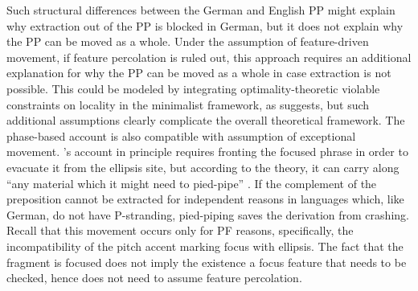 Such structural differences between the German and English PP might explain why extraction out of the PP is blocked in German, but it does not explain why the PP can be moved as a whole. Under the assumption of feature-driven movement, if feature percolation is ruled out, this approach requires an additional explanation for why the PP can be moved as a whole in case extraction is not possible. This could be modeled by integrating optimality-theoretic violable constraints on locality in the minimalist framework, as \citet{heck2008} suggests, but such additional assumptions clearly complicate the overall theoretical framework. The phase-based account is also compatible with  assumption of exceptional movement. \citeauthor{weir2014}'s account in principle requires fronting the focused phrase in order to evacuate it from the ellipsis site, but according to the theory, it can carry along ``any material which it might need to pied-pipe'' \citep[186]{weir2014}. If the complement of the preposition cannot be extracted for independent reasons in languages which, like German, do not have P-stranding, pied-piping saves the derivation from crashing. Recall that this movement occurs only for PF reasons, specifically, the incompatibility of the pitch accent marking focus with ellipsis. The fact that the fragment is focused does not imply the existence a focus feature that needs to be checked, hence \citeauthor{weir2014} does not need to assume feature percolation.

